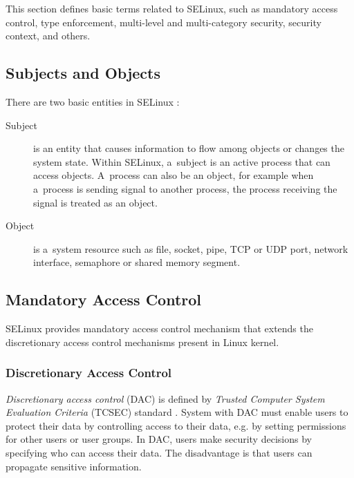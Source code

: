 This section defines basic terms related to SELinux, such as mandatory access
control, type enforcement, multi-level and multi-category security, security
context, and others.

\subsection{Subjects and Objects}
There are two basic entities in SELinux \cite[p.~29]{tsn}:
\begin{description}
    \item [Subject] is an entity that causes information to flow among objects
        or changes the system state. Within SELinux, a~subject is an active
        process that can access objects. A~process can also be an object, for
        example when a~process is sending signal to another process, the process
        receiving the signal is treated as an object.
    \item [Object] is a~system resource such as file, socket, pipe, TCP or UDP
        port, network interface, semaphore or shared memory segment.
\end{description}

\subsection{Mandatory Access Control}

SELinux provides mandatory access control mechanism that extends the
discretionary access control mechanisms present in Linux kernel.

\subsubsection{Discretionary Access Control}
\emph{Discretionary access control} (DAC) is defined by \emph{Trusted Computer
System Evaluation Criteria} (TCSEC) standard \cite{orangebook}. System with DAC
must enable users to protect their data by controlling access to their data,
e.g. by setting permissions for other users or user groups. In DAC, users make
security decisions by specifying who can access their data. The disadvantage is
that users can propagate sensitive information.

